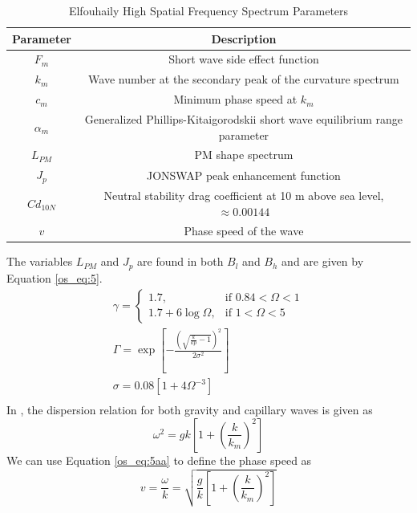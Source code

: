 \begin{table}[H]
  \begin{center}
      \renewcommand{\baselinestretch}{1} \small\normalsize
  \begin{quote}
    \caption[Elfouhaily High Spatial Frequency Spectrum Parameters]{Elfouhaily High Spatial Frequency Spectrum Parameters\label{os_tab:2}}
  \end{quote}
  \begin{tabular} {|c | c |}
    \hline
  \bf{Parameter} & \bf{Description} \\ \hline
  $F_m$ & Short wave side effect function \\ \hline
  $k_m$ &  Wave number at the secondary peak of the curvature spectrum \\ \hline
  $c_m$ &  Minimum phase speed at $k_m$ \\ \hline
  $\alpha_m$ & Generalized Phillips-Kitaigorodskii short wave equilibrium range parameter \\ \hline
  $L_{PM}$ & PM shape spectrum \\ \hline
  $J_p$ & JONSWAP peak enhancement function \\ \hline
  $Cd_{10N}$ & Neutral stability drag coefficient at 10 m above sea level, $\approx 0.00144$ \\ \hline
  $v$ & Phase speed of the wave \\ \hline
\end{tabular}
\end{center}
\end{table}
\renewcommand{\baselinestretch}{2} \small\normalsize
The variables $L_{PM}$ and $J_p$ are found in both $B_l$ and $B_h$ and are given by Equation \ref{os_eq:5}.
\begin{equation}
\begin{gathered}
  \label{os_eq:5}
    \gamma = \begin{cases}
    1.7,& \text{if } 0.84 < \Omega < 1\\
    1.7 + 6\log{\Omega}, & \text{if } 1 < \Omega < 5
  \end{cases} \\
  \Gamma = \exp{\left[- \frac{\left(\sqrt{\frac{k}{kp} - 1} \right)^2}{2\sigma^2} \right]} \\
  \sigma = 0.08\left[1 + 4\Omega^{-3} \right] \\
\end{gathered}
\end{equation}
\renewcommand{\baselinestretch}{2} \small\normalsize
In \cite{elfouhaily}, the dispersion relation for both gravity and capillary waves is given as 
\begin{equation}
\label{os_eq:5aa}
\omega^2 = gk\left[1 + \left(\frac{k}{k_m}\right)^2 \right]
\end{equation}
We can use Equation \ref{os_eq:5aa} to define the phase speed as
\begin{equation}
\label{os_eq:5ab}
v = \frac{\omega}{k}= \sqrt{\frac{g}{k}\left[1 + \left(\frac{k}{k_m}\right)^2 \right]}
\end{equation}

